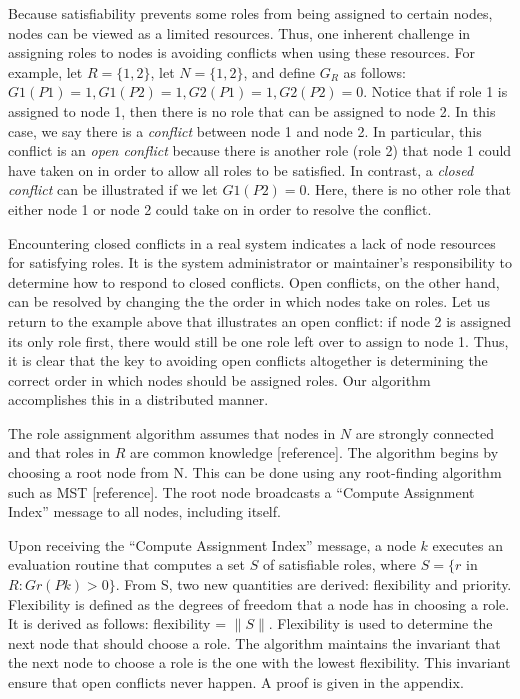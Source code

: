 \documentclass[11pt]{article}
\begin{document}
\begin{multicols}{2}
Because satisfiability prevents some roles from being assigned to certain nodes, nodes can be viewed as a limited resources. Thus, one inherent challenge in assigning roles to nodes is avoiding conflicts when using these resources. For example, let $R = \{1, 2\}$, let $N = \{1, 2\}$, and define $G_{R}$ as follows: $G1(P1) = 1, G1(P2) = 1, G2(P1) = 1, G2(P2) = 0$. Notice that if role 1 is assigned to node 1, then there is no role that can be assigned to node 2. In this case, we say there is a \textit{conflict} between node 1 and node 2. In particular, this conflict is an \textit{open conflict} because there is another role (role 2) that node 1 could have taken on in order to allow all roles to be satisfied. In contrast, a \textit{closed conflict} can be illustrated if we let $G1(P2) = 0$. Here, there is no other role that either node 1 or node 2 could take on in order to resolve the conflict.

Encountering closed conflicts in a real system indicates a lack of node resources for satisfying roles. It is the system administrator or maintainer's responsibility to determine how to respond to closed conflicts. Open conflicts, on the other hand, can be resolved by changing the the order in which nodes take on roles. Let us return to the example above that illustrates an open conflict: if node 2 is assigned its only role first, there would still be one role left over to assign to node 1. Thus, it is clear that the key to avoiding open conflicts altogether is determining the correct order in which nodes should be assigned roles. Our algorithm accomplishes this in a distributed manner.

The role assignment algorithm assumes that nodes in $N$ are strongly connected and that roles in $R$ are common knowledge [reference]. The algorithm begins by choosing a root node from N. This can be done using any root-finding algorithm such as MST [reference]. The root node broadcasts a ``Compute Assignment Index'' message to all nodes, including itself.

Upon receiving the ``Compute Assignment Index'' message, a node $k$ executes an evaluation routine that computes a set $S$ of satisfiable roles, where $S = \{r$ in $R : Gr(Pk) > 0\}$. From S, two new quantities are derived: flexibility and priority. Flexibility is defined as the degrees of freedom that a node has in choosing a role. It is derived as follows: flexibility = $\|S\|$. Flexibility is used to determine the next node that should choose a role. The algorithm maintains the invariant that the next node to choose a role is the one with the lowest flexibility. This invariant ensure that open conflicts never happen. A proof is given in the appendix.


\end{multicols}
\end{document}
